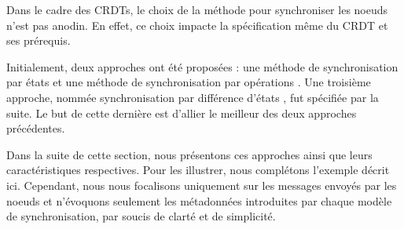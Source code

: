 
Dans le cadre des \acp{CRDT}, le choix de la méthode pour synchroniser les noeuds n'est pas anodin.
En effet, ce choix impacte la spécification même du \ac{CRDT} et ses prérequis.

Initialement, deux approches ont été proposées : une méthode de synchronisation par états \cite{shapiro_2011_crdt, shapiro:inria-00555588} et une méthode de synchronisation par opérations \cite{shapiro_2011_crdt, shapiro:inria-00555588, 2014-making-op-based-crdts-op-based, baquero2017pure}.
Une troisième approche, nommée synchronisation par différence d'états \cite{almeida2015delta, Almeida_2018}, fut spécifiée par la suite.
Le but de cette dernière est d'allier le meilleur des deux approches précédentes.

Dans la suite de cette section, nous présentons ces approches ainsi que leurs caractéristiques respectives.
Pour les illustrer, nous complétons l'exemple décrit ici.
Cependant, nous nous focalisons uniquement sur les messages envoyés par les noeuds et n'évoquons seulement les métadonnées introduites par chaque modèle de synchronisation, par soucis de clarté et de simplicité.
